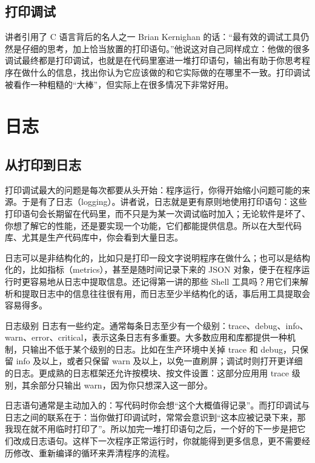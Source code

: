 \documentclass[a4paper]{article}
\begin{document}
\subsection{打印调试}

讲者引用了 C 语言背后的名人之一 Brian Kernighan 的话：“最有效的调试工具仍然是仔细的思考，加上恰当放置的打印语句。”他说这对自己同样成立：他做的很多调试最终都是打印调试，也就是在代码里塞进一堆打印语句，输出有助于你思考程序在做什么的信息，找出你认为它应该做的和它实际做的在哪里不一致。打印调试被看作一种粗糙的“大棒”，但实际上在很多情况下非常好用。

\section{日志}

\subsection{从打印到日志}

打印调试最大的问题是每次都要从头开始：程序运行，你得开始缩小问题可能的来源。于是有了日志（logging）。讲者说，日志就是更有原则地使用打印语句：这些打印语句会长期留在代码里，而不只是为某一次调试临时加入；无论软件是坏了、你想了解它的性能，还是要实现一个功能，它们都能提供信息。所以在大型代码库、尤其是生产代码库中，你会看到大量日志。

日志可以是非结构化的，比如只是打印一段文字说明程序在做什么；也可以是结构化的，比如指标（metrics），甚至是随时间记录下来的 JSON 对象，便于在程序运行时更容易地从日志中提取信息。还记得第一讲的那些 Shell 工具吗？用它们来解析和提取日志中的信息往往很有用，而日志至少半结构化的话，事后用工具提取会容易得多。

\begin{knowledgebox}{日志级别}
日志有一些约定。通常每条日志至少有一个级别：trace、debug、info、warn、error、critical，表示这条日志有多重要。大多数应用和库都提供一种机制，只输出不低于某个级别的日志。比如在生产环境中关掉 trace 和 debug，只保留 info 及以上，或者只保留 warn 及以上，以免一直刷屏；调试时则打开更详细的日志。更成熟的日志框架还允许按模块、按文件设置：这部分应用用 trace 级别，其余部分只输出 warn，因为你只想深入这一部分。
\end{knowledgebox}

日志语句通常是主动加入的：写代码时你会想“这个大概值得记录”。而打印调试与日志之间的联系在于：当你做打印调试时，常常会意识到“这本应被记录下来，那我现在就不用临时打印了”。所以加完一堆打印语句之后，一个好的下一步是把它们改成日志语句。这样下一次程序正常运行时，你就能得到更多信息，更不需要经历修改、重新编译的循环来弄清程序的流程。
\end{document}
